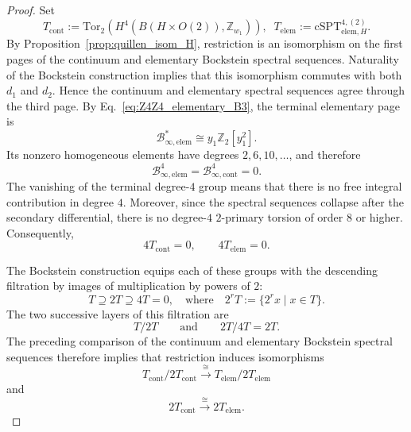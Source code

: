 \documentclass[aps,prx,reprint,superscriptaddress,twocolumn,amsmath,amssymb,amsfonts, nofootinbib]{revtex4-2}
\newcommand{\tor}{\text{Tor}}
\theoremstyle{apsstyle}
\begin{document}
\begin{proof}
Set
\begin{equation*}
T_{\mathrm{cont}}
:=
\tor_2
\left(
H^4(B(H\times O(2)),\mathbb Z_{w_1})
\right),
\;\;
T_{\mathrm{elem}}
:=
\mathrm{cSPT}_{\mathrm{elem},H}^{4,(2)}.
\end{equation*}
By Proposition~\ref{prop:quillen_isom_H}, restriction is an
isomorphism on the first pages of the continuum and elementary
Bockstein spectral sequences. Naturality of the Bockstein
construction implies that this isomorphism commutes with both
$d_1$ and $d_2$. Hence the continuum and elementary spectral
sequences agree through the third page. By Eq.~\eqref{eq:Z4Z4_elementary_B3}, the terminal elementary page is
\begin{equation*}
\mathcal B_{\infty,\mathrm{elem}}^{*}
\cong
y_1\mathbb Z_2[y_1^2].
\end{equation*}
Its nonzero homogeneous elements have degrees $2,6,10,\ldots$, and
therefore
\begin{equation}
\mathcal B_{\infty,\mathrm{elem}}^{4}
=
\mathcal B_{\infty,\mathrm{cont}}^{4}
=
0.
\label{eq:Z4Z4_terminal_degree4_zero}
\end{equation}
The vanishing of the terminal degree-$4$ group means that there is no
free integral contribution in degree $4$. Moreover, since the
spectral sequences collapse after the secondary differential, there
is no degree-$4$ $2$-primary torsion of order $8$ or higher.
Consequently,
\begin{equation*}
4T_{\mathrm{cont}}=0,
\qquad
4T_{\mathrm{elem}}=0.
\end{equation*}

The Bockstein construction equips each of these groups with the
descending filtration by images of multiplication by powers of $2$:
\begin{equation*}
T \supseteq 2T \supseteq
4T=0,\quad \text{where}\quad
2^rT
:=
\{2^r x\mid x\in T\}.
\end{equation*}
The two successive layers of this filtration are
\begin{equation*}
T/2T
\qquad\text{and}\qquad
2T/4T=2T.
\end{equation*}
The preceding comparison of the continuum and elementary Bockstein
spectral sequences therefore implies that restriction induces
isomorphisms
\begin{equation}
T_{\mathrm{cont}}/2T_{\mathrm{cont}}
\xrightarrow{\cong}
T_{\mathrm{elem}}/2T_{\mathrm{elem}}
\label{eq:Z4Z4_quotient_layer_iso}
\end{equation}
and
\begin{equation}
2T_{\mathrm{cont}}
\xrightarrow{\cong}
2T_{\mathrm{elem}}.
\label{eq:Z4Z4_double_layer_iso}
\end{equation}


\end{proof}
\end{document}
